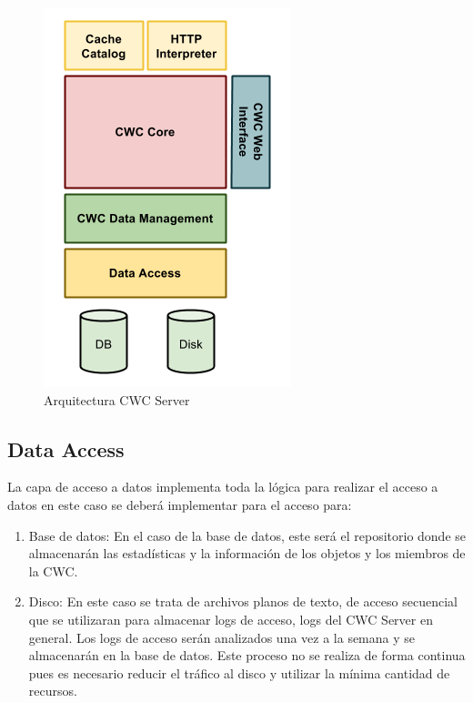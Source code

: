 \begin{figure}[h]
  \centering
    \includegraphics[scale=0.75]{gfx/ArquitecturaCWCServer}
  \caption{Arquitectura CWC Server}
  \label{ArquitecturaCWCServer}
\end{figure}


\subsection{Data Access}

La capa de acceso a datos implementa toda la lógica para realizar el acceso a datos en este caso se deberá implementar para el acceso para:

\begin{enumerate}
\item Base de datos: En el caso de la base de datos, este será el repositorio donde se almacenarán las estadísticas y la información de los objetos y los miembros de la CWC.
\item Disco: En este caso se trata de archivos planos de texto, de acceso secuencial que se utilizaran para almacenar logs de acceso, logs del CWC Server en general. Los logs de acceso serán analizados una vez a la semana y se almacenarán en la base de datos. Este proceso no se realiza de forma continua pues es necesario reducir el tráfico al disco y utilizar la mínima cantidad de recursos.
\end{enumerate}

